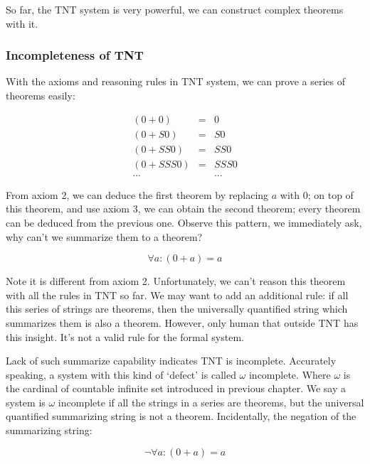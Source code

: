 \documentclass{article}
\begin{document}
So far, the TNT system is very powerful, we can construct complex theorems with it.

\begin{Exercise}
\end{Exercise}

\subsubsection{Incompleteness of TNT}

With the axioms and reasoning rules in TNT system, we can prove a series of theorems easily:

\[
\begin{array}{rcl}
(0 + 0) & = & 0 \\
(0 + S0) & = & S0 \\
(0 + SS0) & = & SS0 \\
(0 + SSS0) & = & SSS0 \\
... & & ...
\end{array}
\]

From axiom 2, we can deduce the first theorem by replacing $a$ with 0; on top of this theorem, and use axiom 3, we can obtain the second theorem; every theorem can be deduced from the previous one. Observe this pattern, we immediately ask, why can't we summarize them to a theorem?

\[
\forall a: (0 + a) = a
\]

Note it is different from axiom 2. Unfortunately, we can't reason this theorem with all the rules in TNT so far. We may want to add an additional rule: if all this series of strings are theorems, then the universally quantified string which summarizes them is also a theorem. However, only human that outside TNT has this insight. It's not a valid rule for the formal system.

Lack of such summarize capability indicates TNT is incomplete. Accurately speaking, a system with this kind of `defect' is called $\omega$ incomplete. Where $\omega$ is the cardinal of countable infinite set introduced in previous chapter. We say a system is $\omega$ incomplete if all the strings in a series are theorems, but the universal quantified summarizing string is not a theorem. Incidentally, the negation of the summarizing string:

\[
\lnot \forall a: (0 + a) = a
\]
\end{document}
